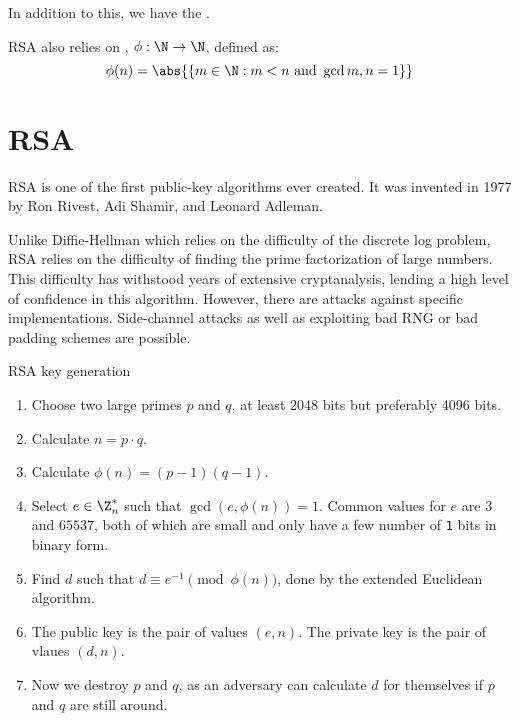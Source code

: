 In addition to this, we have the .

RSA also relies on , $\phi : \N \to \N$, defined as:
\[ \phi(n) = \abs{ \{ m \in \N : m < n\ \text{and}\ \gcd{m,n}=1 \} } \]

\section{RSA}

\begin{dfnbox}{RSA}{}
     is one of the first public-key algorithms ever created. It was invented in 1977 by Ron Rivest, Adi Shamir, and Leonard Adleman.
\end{dfnbox}

Unlike Diffie-Hellman which relies on the difficulty of the discrete log problem, RSA relies on the difficulty of finding the prime factorization of large numbers. This difficulty has withstood years of extensive cryptanalysis, lending a high level of confidence in this algorithm. However, there are attacks against specific implementations. Side-channel attacks as well as exploiting bad RNG or bad padding schemes are possible.

\begin{tecbox}{RSA key generation}{}
    \begin{enumerate}
        \item Choose two large primes $p$ and $q$, at least 2048 bits but preferably 4096 bits.
        \item Calculate $n = p \cdot q$.
        \item Calculate $\phi(n) = (p-1)(q-1)$.
        \item Select $e \in \Z_n^*$ such that $\gcd(e, \phi(n)) = 1$. Common values for $e$ are $3$ and $65537$, both of which are small and only have a few number of \texttt{1} bits in binary form.
        \item Find $d$ such that $d \equiv e^{-1} \pmod{\phi(n)}$, done by the extended Euclidean algorithm.
        \item The public key is the pair of values $(e, n)$. The private key is the pair of vlaues $(d, n)$.
        \item Now we destroy $p$ and $q$, as an adversary can calculate $d$ for themselves if $p$ and $q$ are still around.
    \end{enumerate}
\end{tecbox}

